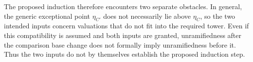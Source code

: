 {\color{blue}
The proposed induction therefore encounters two separate obstacles. In
general, the generic exceptional point $\eta_{C'}$ does not necessarily
lie above $\eta_C$, so the two intended inputs concern valuations that
do not fit into the required tower. Even if this compatibility is assumed
and both inputs are granted, unramifiedness after the comparison base
change does not formally imply unramifiedness before it. Thus the two
inputs do not by themselves establish the proposed induction step.
\par}
